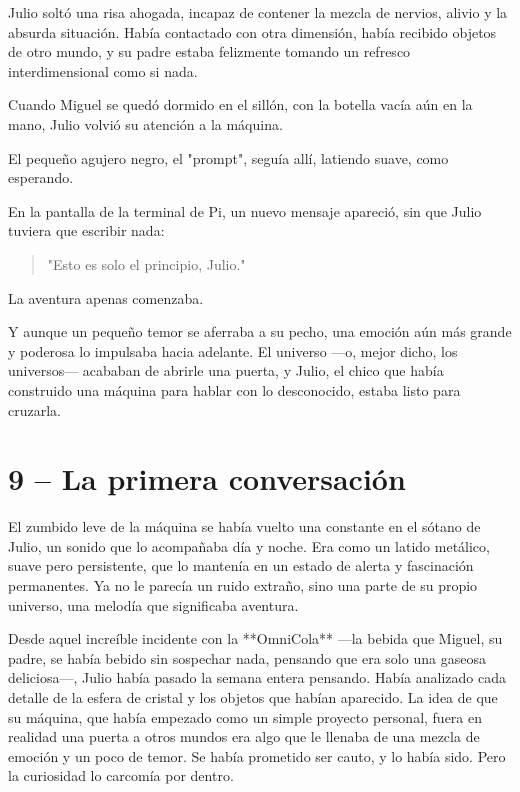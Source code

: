 \documentclass[a4paper,12pt]{book}
\begin{document}
Julio soltó una risa ahogada, incapaz de contener la mezcla de nervios, alivio y la absurda situación. Había contactado con otra dimensión, había recibido objetos de otro mundo, y su padre estaba felizmente tomando un refresco interdimensional como si nada.

Cuando Miguel se quedó dormido en el sillón, con la botella vacía aún en la mano, Julio volvió su atención a la máquina.

El pequeño agujero negro, el "prompt", seguía allí, latiendo suave, como esperando.

En la pantalla de la terminal de Pi, un nuevo mensaje apareció, sin que Julio tuviera que escribir nada:

\begin{quote}
    "Esto es solo el principio, Julio."
\end{quote}

La aventura apenas comenzaba.

Y aunque un pequeño temor se aferraba a su pecho, una emoción aún más grande y poderosa lo impulsaba hacia adelante. El universo —o, mejor dicho, los universos— acababan de abrirle una puerta, y Julio, el chico que había construido una máquina para hablar con lo desconocido, estaba listo para cruzarla.

\cleardoublepage %

\chapter*{9 – La primera conversación}

El zumbido leve de la máquina se había vuelto una constante en el sótano de Julio, un sonido que lo acompañaba día y noche. Era como un latido metálico, suave pero persistente, que lo mantenía en un estado de alerta y fascinación permanentes. Ya no le parecía un ruido extraño, sino una parte de su propio universo, una melodía que significaba aventura.

Desde aquel increíble incidente con la **OmniCola** —la bebida que Miguel, su padre, se había bebido sin sospechar nada, pensando que era solo una gaseosa deliciosa—, Julio había pasado la semana entera pensando. Había analizado cada detalle de la esfera de cristal y los objetos que habían aparecido. La idea de que su máquina, que había empezado como un simple proyecto personal, fuera en realidad una puerta a otros mundos era algo que le llenaba de una mezcla de emoción y un poco de temor. Se había prometido ser cauto, y lo había sido. Pero la curiosidad lo carcomía por dentro.
\end{document}
